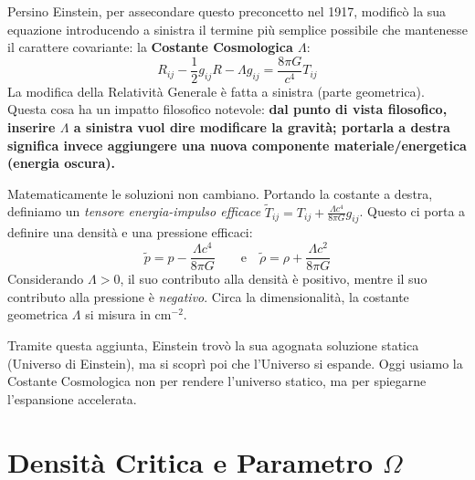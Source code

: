 \documentclass[11pt,a4paper]{report}
\begin{document}
Persino Einstein, per assecondare questo preconcetto nel 1917, modificò la sua equazione introducendo a sinistra il termine più semplice possibile che mantenesse il carattere covariante: la \textbf{Costante Cosmologica $\Lambda$}:
\begin{equation}
R_{ij} - \frac{1}{2}g_{ij}R - \Lambda g_{ij} = \frac{8\pi G}{c^4} T_{ij}
\end{equation}
La modifica della Relatività Generale è fatta a sinistra (parte geometrica). Questa cosa ha un impatto filosofico notevole: \textbf{dal punto di vista filosofico, inserire $\Lambda$ a sinistra vuol dire modificare la gravità; portarla a destra significa invece aggiungere una nuova componente materiale/energetica (energia oscura).}

Matematicamente le soluzioni non cambiano. Portando la costante a destra, definiamo un \textit{tensore energia-impulso efficace} $\tilde{T}_{ij} = T_{ij} + \frac{\Lambda c^4}{8\pi G} g_{ij}$. Questo ci porta a definire una densità e una pressione efficaci:
\begin{equation}
\tilde{p} = p - \frac{\Lambda c^4}{8\pi G} \qquad \text{e} \quad \tilde{\rho} = \rho + \frac{\Lambda c^2}{8\pi G}
\end{equation}
Considerando $\Lambda > 0$, il suo contributo alla densità è positivo, mentre il suo contributo alla pressione è \textit{negativo}. Circa la dimensionalità, la costante geometrica $\Lambda$ si misura in $\text{cm}^{-2}$.

Tramite questa aggiunta, Einstein trovò la sua agognata soluzione statica (Universo di Einstein), ma si scoprì poi che l'Universo si espande. Oggi usiamo la Costante Cosmologica non per rendere l'universo statico, ma per spiegarne l'espansione accelerata.

\section{Densità Critica e Parametro $\Omega$}
\end{document}
